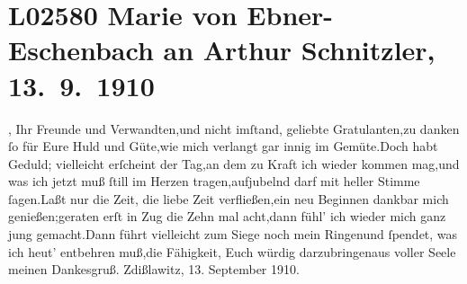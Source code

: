 

\section[Marie von Ebner-Eschenbach an Arthur Schnitzler, 13. 9. 1910]{L02580 Marie von Ebner-Eschenbach an Arthur Schnitzler, 13. 9. 1910}
\nopagebreak{}
\rehead{ }\normalsize\beginnumbering{}
\toendnotes[C]{\smallbreak\pagebreak[2]}
\toendnotes[C]{\smallbreak}\stanza{}{\pb}\label{K_L02580-1v}\label{K_L02580-1}, Ihr Freunde und
                  Verwandten,und nicht imſtand, geliebte Gratulanten,zu danken ſo für Eure Huld und Güte,wie mich verlangt gar innig im Gemüte.Doch habt Geduld; vielleicht erſcheint der Tag,an dem zu Kraft ich wieder kommen mag,und was ich jetzt muß ſtill im Herzen tragen,aufjubelnd darf mit heller Stimme ſagen.Laßt nur die Zeit, die liebe Zeit verfließen,ein neu Beginnen dankbar mich genießen;geraten erſt in Zug die Zehn mal acht,dann fühl’ ich wieder mich ganz jung gemacht.Dann führt vielleicht zum Siege noch mein Ringenund ſpendet, was ich heut’ entbehren muß,die Fähigkeit, Euch würdig darzubringenaus voller Seele meinen Dankesgruß.\stanzaend{}\pstart \spacefill\mbox{}\pend{}
\pstart
           Zdißlawitz, 13. September
                  1910.\pend
           \endnumbering{}  
      